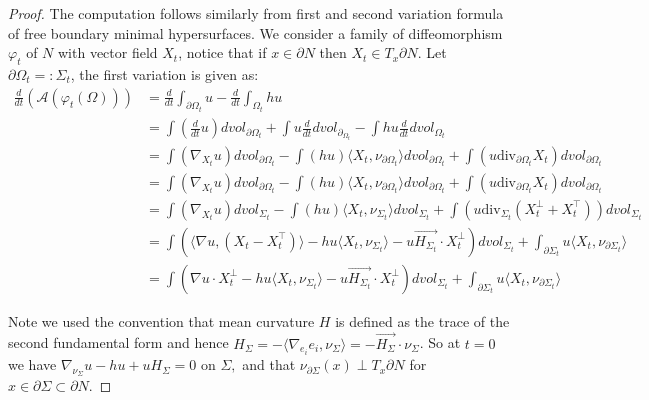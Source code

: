 \documentclass[12pt]{amsart}
\newcommand{\dive}{\text{div}}
\numberwithin{equation}{section}
\begin{document}
	\begin{proof}
		The computation follows similarly from first and second variation formula of free boundary minimal hypersurfaces.
		We consider a family of diffeomorphism $\varphi_t$ of $N$ with vector field $X_t$, notice that if $x \in \partial N$ then $X_t \in T_x \partial N$. Let $\partial \Omega_t =:\Sigma_t$, the first variation is given as:
		\begin{align*}
			\frac{d}{dt}(\mathcal{A}(\varphi_t(\Omega)))&=\frac{d}{dt} \int_{\partial \Omega_t} u - \frac{d}{dt}\int_{\Omega_t} hu\\
			&=\int (\frac{d}{dt}u)dvol_{\partial \Omega_t}+ \int u \frac{d}{dt} dvol_{\partial_{\Omega_t}} - \int hu \frac{d}{dt} dvol_{\Omega_t}\\
			&= \int (\nabla_{X_t} u) dvol_{\partial \Omega_t} -\int (hu) \langle X_t, \nu_{\partial \Omega_t}\rangle dvol_{\partial \Omega_t} + \int (u \dive_{\partial \Omega_t} X_t) dvol_{\partial \Omega_t} \\
			&= \int (\nabla_{X_t} u) dvol_{\partial \Omega_t}  -\int (hu)\langle X_t, \nu_{\partial \Omega_t}\rangle  dvol_{\partial \Omega_t}+\int (u \dive_{\partial \Omega_t} X_t) dvol_{\partial \Omega_t}\\
			&=\int (\nabla_{X_t} u) dvol_{\Sigma_t}  -\int (hu) \langle X_t, \nu_{\Sigma_t}\rangle dvol_{\Sigma_t}+ \int (u \dive_{\Sigma_t} (X^{\perp}_t+X^{\top}_t)) dvol_{\Sigma_t}\\
			&=\int (\langle \nabla u, (X_t-X^{\top}_t)\rangle - hu\langle X_t, \nu_{\Sigma_t}\rangle-u\vec{H_{\Sigma_t}}\cdot X^{\perp}_t ) dvol_{\Sigma_t}+\int_{\partial \Sigma_t} u \langle X_t, \nu_{\partial \Sigma_t}\rangle \\
			&= \int (\nabla u \cdot X^{\perp}_t -hu\langle X_t, \nu_{\Sigma_t}\rangle-u\vec{H_{\Sigma_t}}\cdot X^{\perp}_t ) dvol_{\Sigma_t} + \int_{\partial \Sigma_t} u \langle X_t, \nu_{\partial \Sigma_t}\rangle
		\end{align*}

		Note we used the convention that mean curvature $H$ is defined as the trace of the second fundamental form and hence $H_{\Sigma}=-\langle\nabla_{e_i} e_i,\nu_{\Sigma}\rangle=-\vec{H_{\Sigma}}\cdot \nu_{\Sigma}$.
		So at $t=0$ we have $\nabla_{\nu_{\Sigma}} u-hu+uH_{\Sigma} =0$ on $\Sigma,$ and that $\nu_{\partial \Sigma} (x) \perp T_x\partial N$ for $x \in \partial \Sigma \subset \partial N.$


\end{proof}
\end{document}
